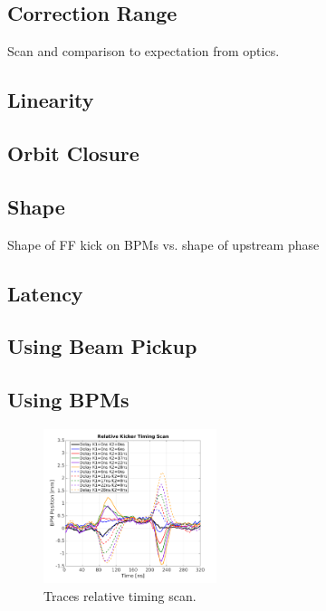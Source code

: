 \subsection{Correction Range}
\label{ss:corrRange}


Scan and comparison to expectation from optics.

\subsection{Linearity}
\label{ss:kickLin}

\subsection{Orbit Closure}
\label{ss:orbitClosure}

\subsection{Shape}
\label{ss:kickShape}

Shape of FF kick on BPMs vs. shape of upstream phase


\subsection{Latency}
\label{ss:measLatency}

\subsection{Using Beam Pickup}
\label{ss:beamPickup}

\subsection{Using BPMs}
\label{ss:relativeBPM}


\begin{figure}
  \centering
  \includegraphics[width=0.45\textwidth]{Figures/relativeTimingScan_traces}
  \caption{Traces relative timing scan.}
  \label{f:relativeTimingScan_traces}
\end{figure}

